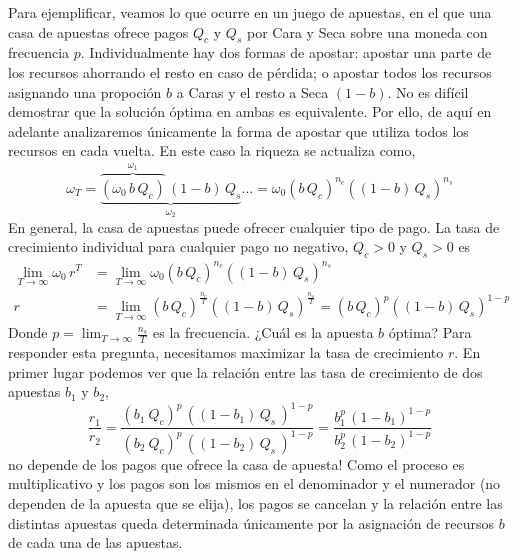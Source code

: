 \documentclass[a4paper,11pt]{book}
\theoremstyle{definition}
\begin{document}

Para ejemplificar, veamos lo que ocurre en un juego de apuestas, en el que una casa de apuestas ofrece pagos $Q_c$ y $Q_s$ por Cara y Seca sobre una moneda con frecuencia $p$.
%
Individualmente hay dos formas de apostar: apostar una parte de los recursos ahorrando el resto en caso de pérdida; o apostar todos los recursos asignando una propoci\'on $b$ a Caras y el resto a Seca $(1-b)$.
%
No es dif\'icil demostrar que la soluci\'on \'optima en ambas es equivalente.
%
Por ello, de aqu\'i en adelante analizaremos \'unicamente la forma de apostar que utiliza todos los recursos en cada vuelta.
%
En este caso la riqueza se actualiza como,
%
\begin{equation} \label{eq:kelly_paraconsistente}
\omega_T = \underbrace{\overbrace{(\omega_0 \, b \, Q_c)}^{\omega_1} \,  (1-b) \, Q_s}_{\omega_2} \dots = \omega_0 (b \, Q_c)^{n_c} ((1-b) \, Q_s )^{n_s}
\end{equation}
%
En general, la casa de apuestas puede ofrecer cualquier tipo de pago.
%
La tasa de crecimiento individual para cualquier pago no negativo, $Q_c > 0$ y $Q_s > 0$ es
%
\begin{equation}
\begin{split}
\lim_{T \rightarrow \infty } \omega_0 \, r^T &= \lim_{T \rightarrow \infty } \omega_0 (b \, Q_c)^{n_c} ((1-b) \, Q_s )^{n_s} \\
r &= \lim_{T \rightarrow \infty } (b \, Q_c)^{\frac{n_c}{T}} ((1-b) \, Q_s )^{\frac{n_s}{T}} = (b \, Q_c)^{p} ((1-b) \, Q_s )^{1-p}
\end{split}
\end{equation}
%
Donde $p = \lim_{T \rightarrow \infty} \frac{n_s}{T}$ es la frecuencia.
%
¿Cuál es la apuesta $b$ \'optima?
%
Para responder esta pregunta, necesitamos maximizar la tasa de crecimiento $r$.
%
En primer lugar podemos ver que la relaci\'on entre las tasa de crecimiento de dos apuestas $b_1$ y $b_2$,
%
\begin{equation}
\frac{r_1}{r_2} = \frac{(b_1 \  Q_c)^{p}  \,  ((1-b_1) \, Q_s \, )^{1-p} }{(b_2 \  Q_c)^{p}  \,  ((1-b_2) \, Q_s \, )^{1-p}  } = \frac{b_1^{p}  \,  (1-b_1)^{1-p} }{b_2^{p}  \,  (1-b_2)^{1-p} }
\end{equation}
%
no depende de los pagos que ofrece la casa de apuesta!
%
Como el proceso es multiplicativo y los pagos son los mismos en el denominador y el numerador (no dependen de la apuesta que se elija), los pagos se cancelan y la relaci\'on entre las distintas apuestas queda determinada \'unicamente por la asignaci\'on de recursos $b$ de cada una de las apuestas.
\end{document}
